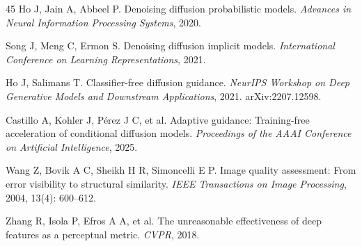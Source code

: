\documentclass[times,twocolumn,final]{elsarticle}
\begin{document}
\begin{thebibliography}{45}
Ho J, Jain A, Abbeel P. Denoising diffusion probabilistic models. \textit{Advances in Neural Information Processing Systems}, 2020.

Song J, Meng C, Ermon S. Denoising diffusion implicit models. \textit{International Conference on Learning Representations}, 2021.

Ho J, Salimans T. Classifier-free diffusion guidance. \textit{NeurIPS Workshop on Deep Generative Models and Downstream Applications}, 2021. arXiv:2207.12598.

Castillo A, Kohler J, P\'erez J C, et al. Adaptive guidance: Training-free acceleration of conditional diffusion models. \textit{Proceedings of the AAAI Conference on Artificial Intelligence}, 2025.

Wang Z, Bovik A C, Sheikh H R, Simoncelli E P. Image quality assessment: From error visibility to structural similarity. \textit{IEEE Transactions on Image Processing}, 2004, 13(4): 600--612.

Zhang R, Isola P, Efros A A, et al. The unreasonable effectiveness of deep features as a perceptual metric. \textit{CVPR}, 2018.

\end{thebibliography}
\endgroup
\end{document}
